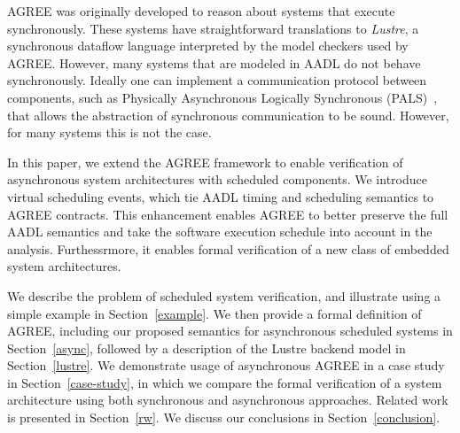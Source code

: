 AGREE was originally developed to reason about systems that execute synchronously. These systems have straightforward translations to \emph{Lustre}, a synchronous dataflow language interpreted by the model checkers used by AGREE. However, many systems that are modeled in AADL do not behave synchronously. Ideally one can implement a communication protocol between components, such as Physically Asynchronous Logically Synchronous (PALS)~\cite{pals}, that allows the abstraction of synchronous communication to be sound. However, for many systems this is not the case.

In this paper, we extend the AGREE framework to enable verification of asynchronous system architectures with scheduled components. We introduce virtual scheduling events, which tie AADL timing and scheduling semantics to AGREE contracts. This enhancement enables AGREE to better preserve the full AADL semantics and take the software execution schedule into account in the analysis.  Furthessrmore, it enables formal verification of a new class of embedded system architectures. 

We describe the problem of scheduled system verification, and illustrate using a simple example in Section~\ref{example}.  We then provide a formal definition of AGREE, including our proposed semantics for asynchronous scheduled systems in Section~\ref{async}, followed by a description of the Lustre backend model in Section~\ref{lustre}.  We demonstrate usage of asynchronous AGREE in a case study in Section~\ref{case-study}, in which we compare the formal verification of a system architecture using both synchronous and asynchronous approaches.  Related work is presented in Section~\ref{rw}.  We discuss our conclusions in Section~\ref{conclusion}.  
